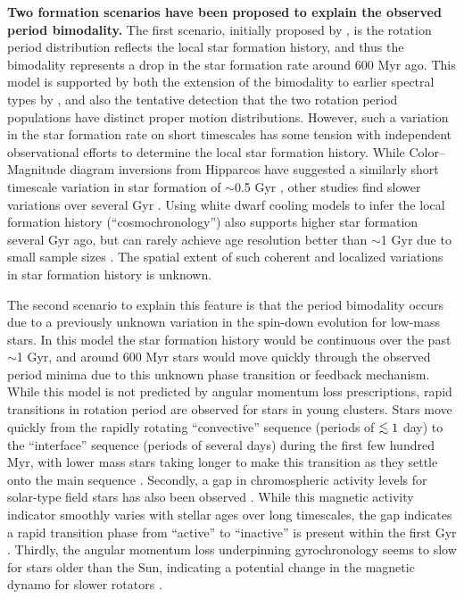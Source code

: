 \documentclass[12pt]{article}
\def\lesssim{\mathrel{\hbox{\rlap{\hbox{\lower3pt\hbox{$\sim$}}}\hbox{\raise2pt\hbox{$<$}}}}}
\begin{document}
{\bf Two formation scenarios have been proposed to explain the observed period bimodality.} The first scenario, initially proposed by \citet{mcquillan2013}, is the rotation period distribution reflects the local star formation history, and thus the bimodality represents a drop in the star formation rate around 600 Myr ago. This model is supported by both the extension of the bimodality to earlier spectral types by \citet{davenport2017}, and also the tentative detection that the two rotation period populations have distinct proper motion distributions. However, such a variation in the star formation rate on short timescales has some tension with independent observational efforts to determine the local star formation history. While Color--Magnitude diagram inversions from Hipparcos have suggested a similarly short timescale variation in star formation of  $\sim$0.5 Gyr \citep{hernandez2000}, other studies find slower variations over several Gyr \citep[e.g.][]{cignoni2006}. Using white dwarf cooling models to infer the local formation history (``cosmochronology'') also supports higher star formation several Gyr ago, but can rarely achieve age resolution better than $\sim$1 Gyr due to small sample sizes \citep{tremblay2014}. The spatial extent of such coherent and localized variations in star formation history is unknown.


The second scenario to explain this feature is that the period bimodality occurs due to a previously unknown variation in the spin-down evolution for low-mass stars. In this model the star formation history would be continuous over the past $\sim$1 Gyr, and around 600 Myr stars would move quickly through the observed period minima due to this unknown phase transition or feedback mechanism. While this model is not predicted by angular momentum loss prescriptions, rapid transitions in rotation period are observed for stars in young clusters. Stars move quickly from the rapidly rotating ``convective'' sequence (periods of $\lesssim1$ day) to the ``interface'' sequence (periods of several days) during the first few hundred Myr, with lower mass stars taking longer to make this transition as they settle onto the main sequence \citep{barnes2003}. Secondly, a gap in chromospheric activity levels for solar-type field stars has also been observed \citep{vaughan1980}. While this magnetic activity indicator smoothly varies with stellar ages over long timescales, the gap indicates a rapid transition phase from ``active'' to ``inactive'' is present within the first Gyr \citep{pace2009}. Thirdly, the angular momentum loss underpinning gyrochronology seems to slow for stars older than the Sun, indicating a potential change in the magnetic dynamo for slower rotators \citep{angus2015,van-saders2016}.
\end{document}
